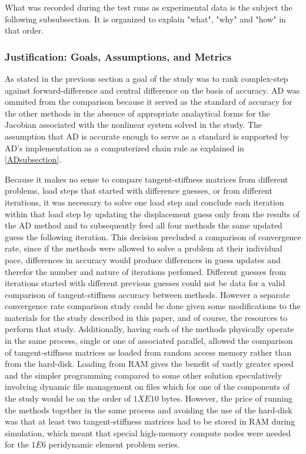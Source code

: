 \documentclass[preprint,12pt]{elsarticle}
\begin{document}
What was recorded during the test runs as experimental data is the subject the following
subsubsection. It is organized to explain "what", "why" and "how" in that order.

\subsubsection{Justification: Goals, Assumptions, and Metrics} \label{JGAM} As stated in the
previous section a goal of the study was to rank complex-step against forward-difference and central
difference on the basis of accuracy. AD was ommited from the comparison because it served as the
standard of accuracy for the other methods in the absence of appropriate analaytical forms for the
Jacobian associated with the nonlinear system solved in the study. The assumption that AD is
accurate enough to serve as a standard is supported by AD's implementation as a computerized chain
rule as explained in \ref{ADsubsection}.

Because it makes no sense to compare tangent-stiffness matrices from different problems, load steps
that started with difference guesses, or from different iterations, it was necessary to solve one
load step and conclude each iteration within that load step by updating the displacement guess only
from the results of the AD method and to subsequently feed all four methods the same updated guess
the following iteration. This decision precluded a comparison of convergence rate, since if the
methods were allowed to solve a problem at their individual pace, differences in accuracy would
produce differences in guess updates and therefor the number and nature of iterations perfomed.
Different guesses from iterations started with different previous guesses could not be data for a
valid comparison of tangent-stiffness accuracy between methods.  However a separate convergence rate
comparison study could be done given some modifications to the materials for the study described in
this paper, and of course, the resources to perform that study.   Additionally, having each of the
methods physically operate in the same process, single or one of associated parallel, allowed the
comparison of tangent-stiffness matrices as loaded from random access memory rather than from the
hard-disk.  Loading from RAM gives the benefit of vastly greater speed and the simpler programming
compared to some other solution speculatively involving dynamic file management on files which for
one of the components of the study would be on the order of $1XE10$ bytes. However, the price of
running the methods together in the same process and avoiding the use of the hard-disk was that at
least two tangent-stiffness matrices had to be stored in RAM during simulation, which meant that
special high-memory compute nodes were needed for the $1E6$ peridynamic element problem series.
\end{document}
